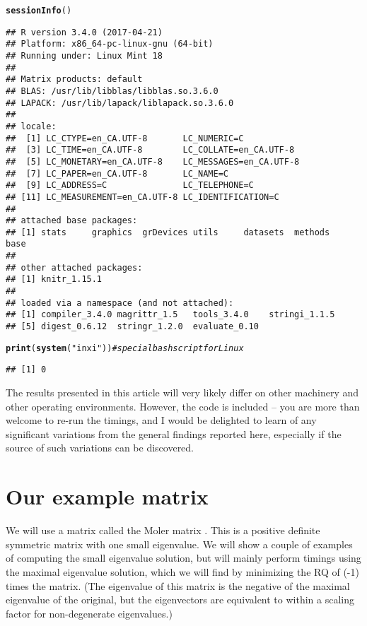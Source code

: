 \documentclass[10pt]{article}\usepackage[]{graphicx}\usepackage[]{color}
\makeatletter
\newcommand{\hlstr}[1]{\textcolor[rgb]{0.192,0.494,0.8}{#1}}%
\newcommand{\hlcom}[1]{\textcolor[rgb]{0.678,0.584,0.686}{\textit{#1}}}%
\newcommand{\hlstd}[1]{\textcolor[rgb]{0.345,0.345,0.345}{#1}}%
\newcommand{\hlkwd}[1]{\textcolor[rgb]{0.737,0.353,0.396}{\textbf{#1}}}%
\newenvironment{kframe}{%
 \def\at@end@of@kframe{}%
 \ifinner\ifhmode%
  \def\at@end@of@kframe{\end{minipage}}%
  \begin{minipage}{\columnwidth}%
 \fi\fi%
 \def\FrameCommand##1{\hskip\@totalleftmargin \hskip-\fboxsep
 \colorbox{shadecolor}{##1}\hskip-\fboxsep
     \hskip-\linewidth \hskip-\@totalleftmargin \hskip\columnwidth}%
 \MakeFramed {\advance\hsize-\width
   \@totalleftmargin\z@ \linewidth\hsize
   \@setminipage}}%
 {\par\unskip\endMakeFramed%
 \at@end@of@kframe}
\newenvironment{knitrout}{}{} %
\makeatother
\begin{document}
\begin{knitrout}\scriptsize
{}\color{fgcolor}\begin{kframe}
\begin{alltt}
\hlkwd{sessionInfo}\hlstd{()}
\end{alltt}
\begin{verbatim}
## R version 3.4.0 (2017-04-21)
## Platform: x86_64-pc-linux-gnu (64-bit)
## Running under: Linux Mint 18
## 
## Matrix products: default
## BLAS: /usr/lib/libblas/libblas.so.3.6.0
## LAPACK: /usr/lib/lapack/liblapack.so.3.6.0
## 
## locale:
##  [1] LC_CTYPE=en_CA.UTF-8       LC_NUMERIC=C              
##  [3] LC_TIME=en_CA.UTF-8        LC_COLLATE=en_CA.UTF-8    
##  [5] LC_MONETARY=en_CA.UTF-8    LC_MESSAGES=en_CA.UTF-8   
##  [7] LC_PAPER=en_CA.UTF-8       LC_NAME=C                 
##  [9] LC_ADDRESS=C               LC_TELEPHONE=C            
## [11] LC_MEASUREMENT=en_CA.UTF-8 LC_IDENTIFICATION=C       
## 
## attached base packages:
## [1] stats     graphics  grDevices utils     datasets  methods   base     
## 
## other attached packages:
## [1] knitr_1.15.1
## 
## loaded via a namespace (and not attached):
## [1] compiler_3.4.0 magrittr_1.5   tools_3.4.0    stringi_1.1.5 
## [5] digest_0.6.12  stringr_1.2.0  evaluate_0.10
\end{verbatim}
\begin{alltt}
\hlkwd{print}\hlstd{(}\hlkwd{system}\hlstd{(}\hlstr{"inxi"}\hlstd{))} \hlcom{# special bash script for Linux}
\end{alltt}
\begin{verbatim}
## [1] 0
\end{verbatim}
\end{kframe}
\end{knitrout}

The results presented in this article will very likely differ on other 
machinery and other operating environments. However, the code is included -- you
are more than welcome to re-run the timings, and I would be delighted to learn
of any significant variations from the general findings reported here, especially
if the source of such variations can be discovered. 


\section{Our example matrix}

We will use a matrix called the Moler matrix \cite[Appendix 1]{cnm79}. 
This is a positive definite
symmetric matrix with one small eigenvalue. We will show a couple of 
examples of computing the small eigenvalue solution, but will mainly
perform timings using the maximal eigenvalue solution, which we will
find by minimizing the RQ of (-1) times the matrix. (The eigenvalue
of this matrix is the negative of the maximal eigenvalue of the 
original, but the eigenvectors are equivalent to within a scaling
factor for non-degenerate eigenvalues.)
\end{document}
